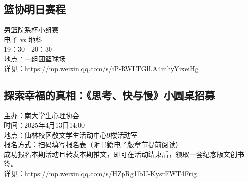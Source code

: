\documentclass[letterpaper, 12pt]{article}
\begin{document}
\begin{multicols}{2}
\subsection{篮协明日赛程}
男篮院系杯小组赛
\\电子 vs 地科 
\\19：30 - 20：30
\\地点：一组团篮球场
\\详见：\url{https://mp.weixin.qq.com/s/iP-RWLTGlLA4mhyYixeiHg}

\subsection{探索幸福的真相：《思考、快与慢》小圆桌招募}
主办：南大学生心理协会
\\时间：2025年4月13日14:00
\\地点：仙林校区敬文学生活动中心9楼活动室
\\报名方式：扫码填写报名表（附书籍电子版章节提前阅读）
\\成功报名本期活动且转发本期推文，即可在活动结束后，领取一套纪念版文创书签。
\\详见：\url{https://mp.weixin.qq.com/s/HZpRg1lbU-KysrFWT4Frig}


\end{multicols}
\end{document}
